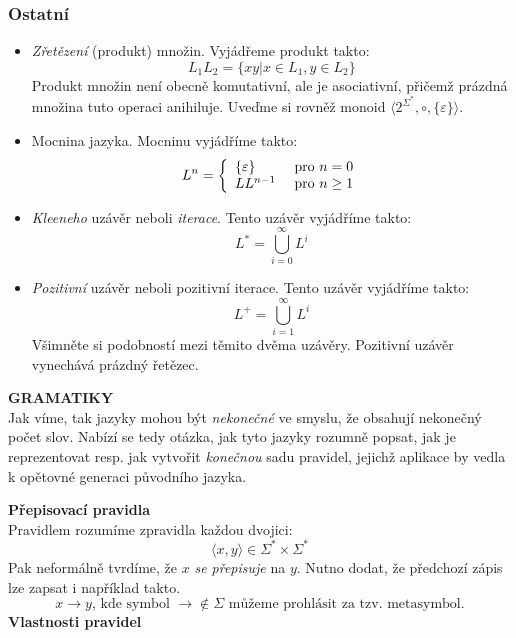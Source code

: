 \documentclass[10pt,a4paper]{article}
\theoremstyle{note}
\begin{document}
		\subsubsection{Ostatní}
		\begin{itemize}
		\item
		\textit{Zřetězení} (produkt) množin. Vyjádřeme produkt takto:
		$$
		L_{1}L_{2} = \lbrace xy | x \in L_{1}, y \in L_{2} \rbrace
		$$
		Produkt množin není obecně komutativní, ale je asociativní, přičemž prázdná množina tuto operaci anihiluje.
		Uveďme si rovněž monoid $\langle 2^{\Sigma^{*}}, \circ, \lbrace \varepsilon \rbrace \rangle$.

		\item
		\textit{}{Mocnina} jazyka. Mocninu vyjádříme takto:
		$$
		L^{n} = \left \lbrace
		\begin{array}{l l}
		\lbrace \varepsilon \rbrace & \text{ pro } n = 0 \\
		LL^{n-1} & \text{ pro } n \geq 1 \\
		\end{array}
		\right.
		$$

		\item
		\textit{Kleeneho} uzávěr neboli 	\textit{iterace}. Tento uzávěr vyjádříme takto:
		$$
		L^{*} = \bigcup_{i = 0}^{\infty} L^{i}
		$$

		\item
		\textit{Pozitivní} uzávěr neboli pozitivní iterace. Tento uzávěr vyjádříme takto:
		$$
		L^{+} = \bigcup_{i = 1}^{\infty} L^{i}
		$$
		Všimněte si podobností mezi těmito dvěma uzávěry. Pozitivní uzávěr vynechává prázdný řetězec.

		\end{itemize}

		\textbf{GRAMATIKY}\\

		\vspace{3mm}
		Jak víme, tak jazyky mohou být \textit{nekonečné} ve smyslu, že obsahují nekonečný počet slov.
		Nabízí se tedy otázka, jak tyto jazyky rozumně popsat, jak je reprezentovat resp. jak vytvořit \textit{konečnou}
		sadu pravidel, jejichž aplikace by vedla k opětovné generaci původního jazyka.


		\textbf{Přepisovací pravidla}\\

		\vspace{3mm}
		Pravidlem rozumíme zpravidla každou dvojici:
		$$
		\langle x,y \rangle \in \Sigma^{*} \times \Sigma^{*}
		$$
		Pak neformálně tvrdíme, že $x$ \textit{se přepisuje} na $y$.
		Nutno dodat, že předchozí zápis lze zapsat i například takto.
		$$
		x \rightarrow y\text{, kde symbol } \rightarrow \notin \Sigma \text{ můžeme prohlásit za tzv. metasymbol.}
		$$
		\textbf{Vlastnosti pravidel}\\
\end{document}
